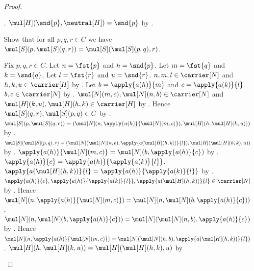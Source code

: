 \begin{proof}
\begin{subproof}
            .
        $\mul[H](\snd{p},\neutral[H])=\snd{p}$ by
            .
    \end{subproof}
    Show that for all $p,q,r\in C$ we have
        $\mul[S](p,\mul[S](q,r))=
            \mul[S](\mul[S](p,q),r)$.
    \begin{subproof}
        Fix $p,q,r\in C$.
        Let $n=\fst{p}$ and $h=\snd{p}$.
        Let $m=\fst{q}$ and $k=\snd{q}$.
        Let $l=\fst{r}$ and $u=\snd{r}$.
        $n,m,l\in\carrier[N]$ and $h,k,u\in\carrier[H]$ by
            .
        Let $b=\apply{a(h)}{m}$ and $c=\apply{a(k)}{l}$.
        $b,c\in\carrier[N]$ by
            .
        $\mul[N](m,c),\mul[N](n,b)\in\carrier[N]$ and
            $\mul[H](k,u),\mul[H](h,k)\in\carrier[H]$ by
            .
        Hence $\mul[S](q,r),\mul[S](p,q)\in C$ by
            .
        $\mul[S](p,\mul[S](q,r))=
            (\mul[N](n,\apply{a(h)}{\mul[N](m,c)}),
             \mul[H](h,\mul[H](k,u)))$ by
            .
        $\mul[S](\mul[S](p,q),r)=
            (\mul[N](\mul[N](n,b),
                \apply{a(\mul[H](h,k))}{l}),
             \mul[H](\mul[H](h,k),u))$ by
            .
        $\apply{a(h)}{\mul[N](m,c)}=
            \mul[N](b,\apply{a(h)}{c})$ by
            .
        $\apply{a(h)}{c}=
            \apply{a(h)}{\apply{a(k)}{l}}$.
        $\apply{a(\mul[H](h,k))}{l}=
            \apply{a(h)}{\apply{a(k)}{l}}$ by
            .
        $\apply{a(h)}{c},
            \apply{a(h)}{\apply{a(k)}{l}},
            \apply{a(\mul[H](h,k))}{l}\in\carrier[N]$ by
            .
        Hence $\mul[N](n,\apply{a(h)}{\mul[N](m,c)})=
            \mul[N](n,
                \mul[N](b,\apply{a(h)}{c}))$.
        $\mul[N](n,\mul[N](b,\apply{a(h)}{c}))=
            \mul[N](\mul[N](n,b),\apply{a(h)}{c})$ by
            .
        Hence
            $\mul[N](n,\apply{a(h)}{\mul[N](m,c)})=
                \mul[N](\mul[N](n,b),
                    \apply{a(\mul[H](h,k))}{l})$.
        $\mul[H](h,\mul[H](k,u))=
            \mul[H](\mul[H](h,k),u)$ by

\end{subproof}
\end{proof}
